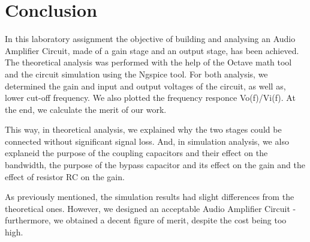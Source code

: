 \section{Conclusion}
\label{sec:conclusion}

In this laboratory assignment the objective of building and analysing an Audio Amplifier Circuit, made of a gain stage and an output stage, has been achieved. The theoretical analysis was performed with the help of the Octave math tool and the circuit simulation using the Ngspice tool. For both analysis, we determined the gain and input and output voltages of the circuit, as well as, lower cut-off frequency. We also plotted the frequency responce Vo(f)/Vi(f). At the end, we calculate the merit of our work.

This way, in theoretical analysis, we explained why the two stages could be connected without significant signal loss. And, in simulation analysis, we also explaneid the purpose of the coupling capacitors and their effect on the bandwidth, the purpose of the bypass capacitor and its effect on the gain and the effect of resistor RC on the gain.

 As previously mentioned, the simulation results had slight differences from the theoretical ones. However, we designed an acceptable Audio Amplifier Circuit - furthermore, we obtained a decent figure of merit, despite the cost being too high.
